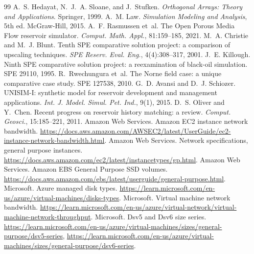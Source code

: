 \documentclass[11pt,a4paper]{article}
\begin{document}
\begin{thebibliography}{99}
 A.~S. Hedayat, N.~J.~A. Sloane, and J.~Stufken. \emph{Orthogonal Arrays: Theory and Applications}. Springer, 1999.
 A.~M. Law. \emph{Simulation Modeling and Analysis}, 5th ed. McGraw-Hill, 2015.
 A.~F. Rasmussen et~al. The Open Porous Media Flow reservoir simulator. \emph{Comput. Math. Appl.}, 81:159--185, 2021.
 M.~A. Christie and M.~J. Blunt. Tenth SPE comparative solution project: a comparison of upscaling techniques. \emph{SPE Reserv. Eval. Eng.}, 4(4):308--317, 2001.
 J.~E. Killough. Ninth SPE comparative solution project: a reexamination of black-oil simulation. SPE 29110, 1995.
 R.~Rwechungura et~al. The Norne field case: a unique comparative case study. SPE 127538, 2010.
 G.~D. Avansi and D.~J. Schiozer. UNISIM-I: synthetic model for reservoir development and management applications. \emph{Int. J. Model. Simul. Pet. Ind.}, 9(1), 2015.
 D.~S. Oliver and Y.~Chen. Recent progress on reservoir history matching: a review. \emph{Comput. Geosci.}, 15:185--221, 2011.
 Amazon Web Services. Amazon EC2 instance network bandwidth. \url{https://docs.aws.amazon.com/AWSEC2/latest/UserGuide/ec2-instance-network-bandwidth.html}.
 Amazon Web Services. Network specifications, general purpose instances. \url{https://docs.aws.amazon.com/ec2/latest/instancetypes/gp.html}.
 Amazon Web Services. Amazon EBS General Purpose SSD volumes. \url{https://docs.aws.amazon.com/ebs/latest/userguide/general-purpose.html}.
 Microsoft. Azure managed disk types. \url{https://learn.microsoft.com/en-us/azure/virtual-machines/disks-types}.
 Microsoft. Virtual machine network bandwidth. \url{https://learn.microsoft.com/en-us/azure/virtual-network/virtual-machine-network-throughput}.
 Microsoft. Dsv5 and Dsv6 size series. \url{https://learn.microsoft.com/en-us/azure/virtual-machines/sizes/general-purpose/dsv5-series}, \url{https://learn.microsoft.com/en-us/azure/virtual-machines/sizes/general-purpose/dsv6-series}.
\end{thebibliography}
\end{document}

